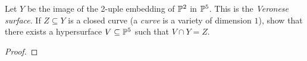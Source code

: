 \label{1.2.13}

Let $Y$ be the image of the 2-uple embedding of $\P^2$ in $\P^5$. This is the \textit{Veronese surface}. If $Z \subseteq Y$ is a closed curve (a \textit{curve} is a variety of dimension $1$), show that
there exists a hypersurface $V \subseteq \P^5$ such that $V \cap Y = Z$.

\begin{proof}
    
\end{proof}